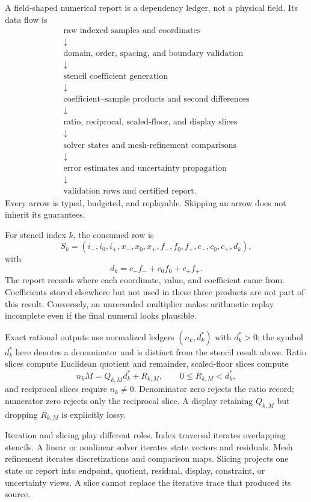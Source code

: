 A field-shaped numerical report is a dependency ledger, not a physical field.  Its data flow is
\[
\begin{array}{c}
\text{raw indexed samples and coordinates}\\
\downarrow\\
\text{domain, order, spacing, and boundary validation}\\
\downarrow\\
\text{stencil coefficient generation}\\
\downarrow\\
\text{coefficient--sample products and second differences}\\
\downarrow\\
\text{ratio, reciprocal, scaled-floor, and display slices}\\
\downarrow\\
\text{solver states and mesh-refinement comparisons}\\
\downarrow\\
\text{error estimates and uncertainty propagation}\\
\downarrow\\
\text{validation rows and certified report}.
\end{array}
\]
Every arrow is typed, budgeted, and replayable.  Skipping an arrow does not inherit its guarantees.

For stencil index \(k\), the consumed row is
\[
S_k=(i_-,i_0,i_+,x_-,x_0,x_+,f_-,f_0,f_+,c_-,c_0,c_+,d_k),
\]
with
\[
                         d_k=c_-f_-+c_0f_0+c_+f_+.
\]
The report records where each coordinate, value, and coefficient came from.  Coefficients stored elsewhere but not
used in these three products are not part of this result.  Conversely, an unrecorded multiplier makes arithmetic
replay incomplete even if the final numeral looks plausible.

Exact rational outputs use normalized ledgers \((n_k,d_k^\ast)\) with \(d_k^\ast>0\); the symbol \(d_k^\ast\) here
denotes a denominator and is distinct from the stencil result above.  Ratio slices compute Euclidean quotient and
remainder, scaled-floor slices compute
\[
n_kM=Q_{k,M}d_k^\ast+R_{k,M},\qquad0\leq R_{k,M}<d_k^\ast,
\]
and reciprocal slices require \(n_k\ne0\).  Denominator zero rejects the ratio record; numerator zero rejects only
the reciprocal slice.  A display retaining \(Q_{k,M}\) but dropping \(R_{k,M}\) is explicitly lossy.

Iteration and slicing play different roles.  Index traversal iterates overlapping stencils.  A linear or nonlinear
solver iterates state vectors and residuals.  Mesh refinement iterates discretizations and comparison maps.  Slicing
projects one state or report into endpoint, quotient, residual, display, constraint, or uncertainty views.  A slice
cannot replace the iterative trace that produced its source.

